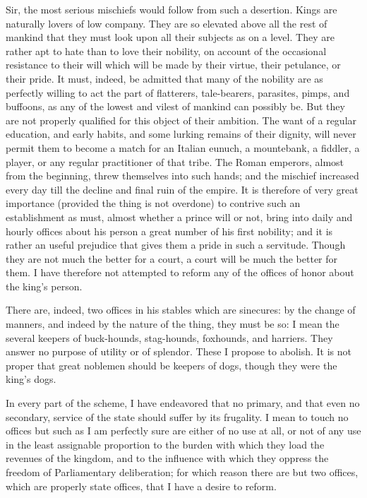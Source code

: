 Sir, the most serious mischiefs would follow from such a desertion. Kings are naturally lovers of low company. They are so elevated above all the rest of mankind that they must look upon all their subjects as on a level. They are rather apt to hate than to love their nobility, on account of the occasional resistance to their will which will be made by their virtue, their petulance, or their pride. It must, indeed, be admitted that many of the nobility are as perfectly willing to act the part of flatterers, tale-bearers, parasites, pimps, and buffoons, as any of the lowest and vilest of mankind can possibly be. But they are not properly qualified for this object of their ambition. The want of a regular education, and early habits, and some lurking remains of their dignity, will never permit them to become a match for an Italian eunuch, a mountebank, a fiddler, a player, or any regular practitioner of that tribe. The Roman emperors, almost from the beginning, threw themselves into such hands; and the mischief increased every day till the decline and final ruin of the empire. It is therefore of very great importance (provided the thing is not overdone) to contrive such an establishment as must, almost whether a prince will or not, bring into daily and hourly offices about his person a great number of his first nobility; and it is rather an useful prejudice that gives them a pride in such a servitude. Though they are not much the better for a court, a court will be much the better for them. I have therefore not attempted to reform any of the offices of honor about the king's person.

There are, indeed, two offices in his stables which are sinecures: by the change of manners, and indeed by the nature of the thing, they must be so: I mean the several keepers of buck-hounds, stag-hounds, foxhounds, and harriers. They answer no purpose of utility or of splendor. These I propose to abolish. It is not proper that great noblemen should be keepers of dogs, though they were the king's dogs.

In every part of the scheme, I have endeavored that no primary, and that even no secondary, service of the state should suffer by its frugality. I mean to touch no offices but such as I am perfectly sure are either of no use at all, or not of any use in the least assignable proportion to the burden with which they load the revenues of the kingdom, and to the influence with which they oppress the freedom of Parliamentary deliberation; for which reason there are but two offices, which are properly state offices, that I have a desire to reform.

